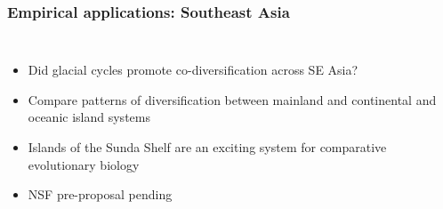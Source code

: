 \begin{frame}
    \frametitle{Empirical applications: Southeast Asia}
    \begin{columns}
        \begin{itemize}[<+->]
            \item Did glacial cycles promote co-diversification across SE Asia?
            \item Compare patterns of diversification between mainland and
                continental and oceanic island systems
            \item Islands of the Sunda Shelf are an exciting system for
                comparative evolutionary biology
            \item NSF pre-proposal pending
        \end{itemize}
        
        {\centering
            {\setlength{\fboxsep}{0pt}
            }
        }
    \end{columns}
\end{frame}

